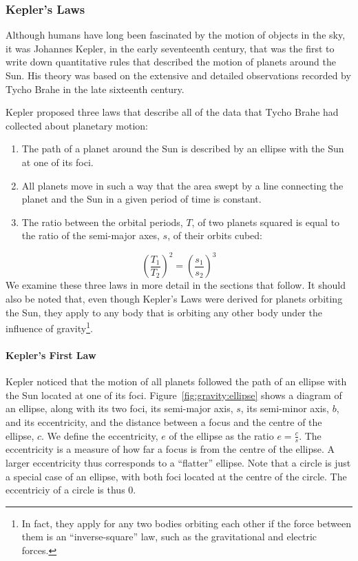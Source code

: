\subsubsection{Kepler's Laws}

Although humans have long been fascinated by the motion of objects in the sky, it was Johannes Kepler, in the early seventeenth century, that was the first to write down quantitative rules that described the motion of planets around the Sun. His theory was based on the extensive and detailed observations recorded by Tycho Brahe in the late sixteenth century.

Kepler proposed three laws that describe all of the data that Tycho Brahe had collected about planetary motion:

\begin{enumerate}
\item The path of a planet around the Sun is described by an ellipse with the Sun at one of its foci.
\item All planets move in such a way that the area swept by a line connecting the planet and the Sun in a given period of time is constant.
\item The ratio between the orbital periods, $T$, of two planets squared is equal to the ratio of the semi-major axes, $s$, of their orbits cubed:
\end{enumerate}
\begin{equation}
\left(\frac{T_1}{T_2}\right)^2=\left(\frac{s_1}{s_2}\right)^3
\end{equation}
We examine these three laws in more detail in the sections that follow. It should also be noted that, even though Kepler's Laws were derived for planets orbiting the Sun, they apply to any body that is orbiting any other body under the influence of gravity\footnote{In fact, they apply for any two bodies orbiting each other if the force between them is an ``inverse-square'' law, such as the gravitational and electric forces.}.

\paragraph{Kepler's First Law}

Kepler noticed that the motion of all planets followed the path of an ellipse with the Sun located at one of its foci. Figure~\ref{fig:gravity:ellipse} shows a diagram of an ellipse, along with its two foci, its semi-major axis, $s$, its semi-minor axis, $b$, and its eccentricity, and the distance between a focus and the centre of the ellipse, $c$. We define the eccentricity, $e$ of the ellipse as the ratio $e=\frac{c}{s}$. The eccentricity is a measure of how far a focus is from the centre of the ellipse. A larger eccentricity thus corresponds to a ``flatter'' ellipse. Note that a circle is just a special case of an ellipse, with both foci located at the centre of the circle. The eccentriciy of a circle is thus 0.


